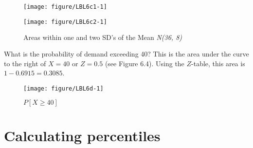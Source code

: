 \documentclass[11pt]{book}\usepackage[]{graphicx}\usepackage[]{color}
\begin{document}
\begin{figure}[ht]

\caption{Areas within one and two SD's of the Mean \textit{N(36, 8)}}

\begin{minipage}[ht]{7cm}



{\centering \texttt{[image: figure/LBL6c1-1]} 

}



\end{minipage}
\begin{minipage}[ht]{7cm}


{\centering \texttt{[image: figure/LBL6c2-1]} 

}



\end{minipage}
\end{figure}

What is the probability of demand exceeding 40?  This is the area under the curve to the right of $X = 40$ or $Z = 0.5$ (see Figure 6.4).  Using the $Z$-table, this area is $1 -  0.6915 = 0.3085$.

\begin{figure}[ht]

\caption{$P[ X \ge 40 ]$ }





{\centering \texttt{[image: figure/LBL6d-1]} 

}




\end{figure}

\section{Calculating percentiles}     %
\end{document}
